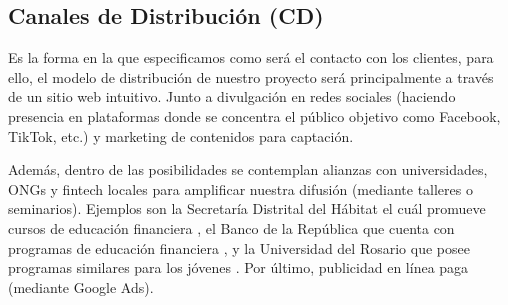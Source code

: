 {}
\subsection*{Canales de Distribución (CD)}

Es la forma en la que especificamos como será el contacto con los clientes, para ello, el modelo de distribución de nuestro proyecto será principalmente a través de un sitio web intuitivo. Junto a divulgación en redes sociales (haciendo presencia en plataformas donde se concentra el público objetivo como Facebook, TikTok, etc.) y marketing de contenidos para captación. 

Además, dentro de las posibilidades se contemplan alianzas con universidades, ONGs y fintech locales para amplificar nuestra difusión (mediante talleres o seminarios). Ejemplos son la Secretaría Distrital del Hábitat el cuál promueve cursos de educación financiera \parencite{SecretariaBogota01}, el Banco de la República que cuenta con programas de educación financiera \parencite{BanRepEduca01}, y la Universidad del Rosario que posee programas similares para los jóvenes \parencite{UniverRosario01}. Por último, publicidad en línea paga (mediante Google Ads).